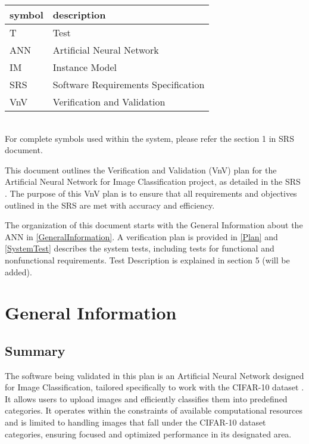 \documentclass[12pt, titlepage]{article}
\begin{document}
\renewcommand{\arraystretch}{1.2}
\begin{tabular}{l l} 
  \toprule		
  \textbf{symbol} & \textbf{description}\\
  \midrule 
  T & Test\\
  ANN & Artificial Neural Network\\
  IM & Instance Model\\
  SRS & Software Requirements Specification\\
  VnV & Verification and Validation\\
  \bottomrule
\end{tabular}\\

For complete symbols used within the system, please refer the section 1 in 
SRS \cite{SRS} document.



\newpage


This document outlines the Verification and Validation (VnV) plan for the Artificial 
Neural Network for Image Classification project, as detailed in the 
SRS \cite{SRS}. 
The purpose of this VnV plan is to ensure that all requirements and objectives outlined 
in the SRS \cite{SRS} 
are met with accuracy and efficiency.

The organization of this document starts with the General Information about the ANN in \autoref{GeneralInformation}. 
A verification plan is provided in \autoref{Plan} and \autoref{SystemTest} 
describes the system tests, including tests for functional and nonfunctional requirements. 
Test Description is explained in section 5 (will be added).

\section{General Information}\label{GeneralInformation}

\subsection{Summary}

The software being validated in this plan is an Artificial Neural Network designed for 
Image Classification, tailored specifically to work with the CIFAR-10 dataset \cite{CIFAR10}. 
It allows users to upload images and efficiently classifies them into predefined 
categories. It operates within the constraints of available computational 
resources and is limited to handling images that fall under the CIFAR-10 dataset \cite{CIFAR10}
categories, ensuring focused and optimized performance in its designated area.
\end{document}
